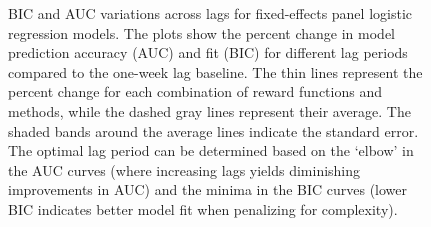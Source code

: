 \documentclass[
  number,
  preprint,
  3p,
  onecolumn]{elsarticle}
\begin{document}
\begin{figure}

\begin{minipage}{0.50\linewidth}



\end{minipage}%
%
\begin{minipage}{0.50\linewidth}



\end{minipage}%
\newline
\begin{minipage}{0.50\linewidth}



\end{minipage}%
%
\begin{minipage}{0.50\linewidth}



\end{minipage}%

\caption{\label{fig-panel-bic}BIC and AUC variations across lags for
fixed-effects panel logistic regression models. The plots show the
percent change in model prediction accuracy (AUC) and fit (BIC) for
different lag periods compared to the one-week lag baseline. The thin
lines represent the percent change for each combination of reward
functions and methods, while the dashed gray lines represent their
average. The shaded bands around the average lines indicate the standard
error. The optimal lag period can be determined based on the `elbow' in
the AUC curves (where increasing lags yields diminishing improvements in
AUC) and the minima in the BIC curves (lower BIC indicates better model
fit when penalizing for complexity).}

\end{figure}%
\end{document}
